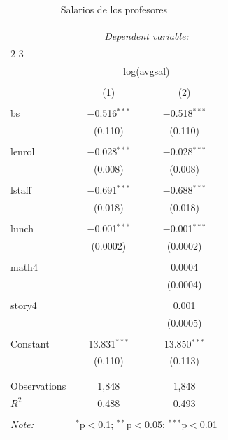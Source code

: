 \documentclass[10pt,a4paper]{article}
\begin{document}
\begin{enumerate}
\begin{table}[H] \centering 
  \caption{Salarios de los profesores }  \label{tabla_reg}%
\begin{tabular}[H]{@{\extracolsep{5pt}}lcc} 
\\[-1.8ex]\hline 
\hline \\[-1.8ex] 
 & \multicolumn{2}{c}{\textit{Dependent variable:}} \\ 
\cline{2-3} 
\\[-1.8ex] & \multicolumn{2}{c}{log(avgsal)} \\ 
\\[-1.8ex] & (1) & (2)\\ 
\hline \\[-1.8ex] 
 bs & $-$0.516$^{***}$ & $-$0.518$^{***}$ \\ 
  & (0.110) & (0.110) \\ 
  & & \\ 
 lenrol & $-$0.028$^{***}$ & $-$0.028$^{***}$ \\ 
  & (0.008) & (0.008) \\ 
  & & \\ 
 lstaff & $-$0.691$^{***}$ & $-$0.688$^{***}$ \\ 
  & (0.018) & (0.018) \\ 
  & & \\ 
 lunch & $-$0.001$^{***}$ & $-$0.001$^{***}$ \\ 
  & (0.0002) & (0.0002) \\ 
  & & \\ 
 math4 &  & 0.0004 \\ 
  &  & (0.0004) \\ 
  & & \\ 
 story4 &  & 0.001 \\ 
  &  & (0.0005) \\ 
  & & \\ 
 Constant & 13.831$^{***}$ & 13.850$^{***}$ \\ 
  & (0.110) & (0.113) \\ 
  & & \\ 
\hline \\[-1.8ex] 
Observations & 1,848 & 1,848 \\ 
$R^{2}$ & 0.488 & 0.493 \\ 

\hline 
\hline \\[-1.8ex] 
\textit{Note:}  & \multicolumn{2}{r}{$^{*}$p$<$0.1; $^{**}$p$<$0.05; $^{***}$p$<$0.01} \\ 
\end{tabular}
\end{table} 


\end{enumerate}
\end{document}

